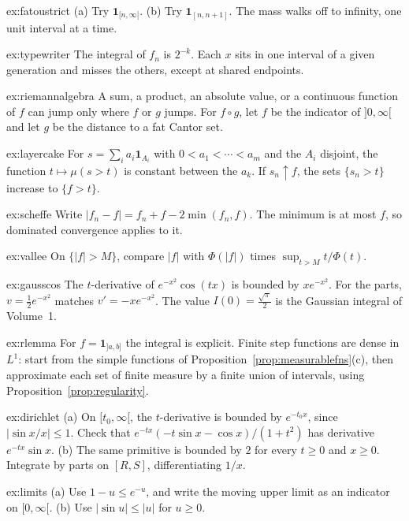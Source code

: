 \begin{hint}{ex:fatoustrict}
(a) Try \(\mathbf 1_{[n,\infty[}\). (b) Try \(\mathbf 1_{[n,n+1]}\). The mass walks off to infinity, one unit interval at a time.
\end{hint}
\begin{hint}{ex:typewriter}
The integral of \(f_n\) is \(2^{-k}\). Each \(x\) sits in one interval of a given generation and misses the others, except at shared endpoints.
\end{hint}
\begin{hint}{ex:riemannalgebra}
A sum, a product, an absolute value, or a continuous function of \(f\) can jump only where \(f\) or \(g\) jumps. For \(f\circ g\), let \(f\) be the indicator of \(]0,\infty[\) and let \(g\) be the distance to a fat Cantor set.
\end{hint}
\begin{hint}{ex:layercake}
For \(s=\sum_ia_i\mathbf 1_{A_i}\) with \(0<a_1<\cdots<a_m\) and the \(A_i\) disjoint, the function \(t\mapsto\mu(s>t)\) is constant between the \(a_k\). If \(s_n\uparrow f\), the sets \(\{s_n>t\}\) increase to \(\{f>t\}\).
\end{hint}
\begin{hint}{ex:scheffe}
Write \(|f_n-f|=f_n+f-2\min(f_n,f)\). The minimum is at most \(f\), so dominated convergence applies to it.
\end{hint}
\begin{hint}{ex:vallee}
On \(\{|f|>M\}\), compare \(|f|\) with \(\Phi(|f|)\) times \(\sup_{t>M}t/\Phi(t)\).
\end{hint}
\begin{hint}{ex:gausscos}
The \(t\)-derivative of \(e^{-x^2}\cos(tx)\) is bounded by \(xe^{-x^2}\). For the parts, \(v=\frac12e^{-x^2}\) matches \(v'=-xe^{-x^2}\). The value \(I(0)=\frac{\sqrt\pi}2\) is the Gaussian integral of Volume~1.
\end{hint}
\begin{hint}{ex:rlemma}
For \(f=\mathbf 1_{]a,b]}\) the integral is explicit. Finite step functions are dense in \(L^1\): start from the simple functions of Proposition~\ref{prop:measurablefns}(c), then approximate each set of finite measure by a finite union of intervals, using Proposition~\ref{prop:regularity}.
\end{hint}
\begin{hint}{ex:dirichlet}
(a) On \([t_0,\infty[\), the \(t\)-derivative is bounded by \(e^{-t_0x}\), since \(|\sin x/x|\le1\). Check that \(e^{-tx}(-t\sin x-\cos x)/(1+t^2)\) has derivative \(e^{-tx}\sin x\). (b) The same primitive is bounded by \(2\) for every \(t\ge0\) and \(x\ge0\). Integrate by parts on \([R,S]\), differentiating \(1/x\).
\end{hint}
\begin{hint}{ex:limits}
(a) Use \(1-u\le e^{-u}\), and write the moving upper limit as an indicator on \([0,\infty[\). (b) Use \(|\sin u|\le|u|\) for \(u\ge0\).
\end{hint}

